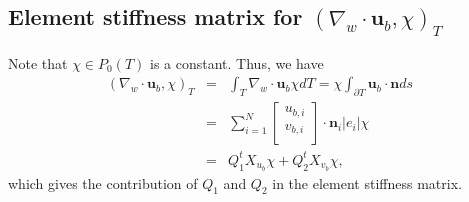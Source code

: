 \documentclass[final,leqno]{siamltex704}
\begin{document}
\subsection{Element stiffness matrix for $(\nabla_w\cdot \bm{u}_b,\chi)_T$} Note that $\chi\in P_0(T)$ is a constant. Thus, we have
\begin{eqnarray}
(\nabla_w\cdot \bm{u}_b,\chi)_T& =& \int_{T} \nabla_w\cdot \bm{u}_b \chi dT = \chi \int_{\partial T} \bm{u}_b \cdot \bm{n} ds  \label{equ.SM.5}\\
&=& \sum_{i=1}^N
\begin{bmatrix}
u_{b,i} \\
v_{b,i} \\
\end{bmatrix}
\cdot \bm{n}_i|e_i| \chi \nonumber\\
&=&
Q_1^t X_{u_b} \chi + Q_2^t X_{v_b} \chi,
\end{eqnarray}
which gives the contribution of $Q_1$ and $Q_2$ in the element stiffness matrix.
\end{document}
